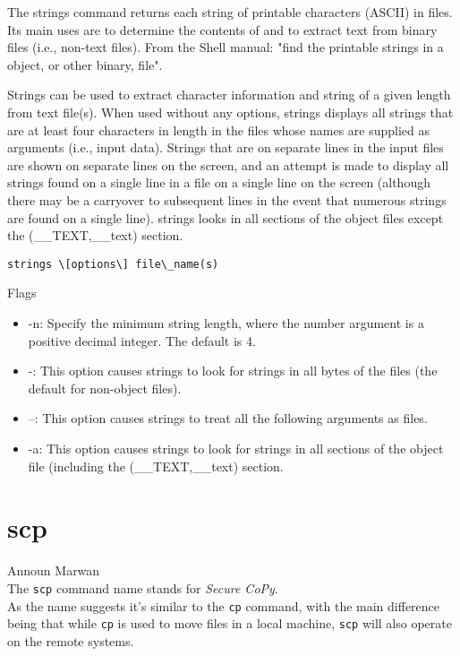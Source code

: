 \documentclass[hidelinks,12pt,a4paper,numbers=enddot]{scrartcl}
\begin{document}
The strings command returns each string of printable characters (ASCII)
in files. Its main uses are to determine the contents of and to extract text
from binary files (i.e., non-text files). From the Shell manual: "find the
printable strings in a object, or other binary, file".




Strings can be used to extract character information and string of a given length
from text file(s). When used without any options, strings displays all strings
that are at least four characters in length in the files whose names are
supplied as arguments (i.e., input data). Strings that are on separate lines
in the input files are shown on separate lines on the screen, and an attempt
is made to display all strings found on a single line in a file on a single
line on the screen (although there may be a carryover to subsequent lines in
the event that numerous strings are found on a single line). strings looks in
all sections of the object files except the (\_\_TEXT,\_\_text) section.


\begin{verbatim}
strings \[options\] file\_name(s)
\end{verbatim}

Flags

\begin{itemize}
    \item -n: Specify the minimum string length, where the number argument is
        a positive decimal integer. The default is 4.
    \item -: This  option  causes strings to look for strings in all bytes of
        the files (the default for non-object files).
    \item --: This option causes strings to treat all the following  arguments
        as files.
    \item -a: This option causes strings to look for strings in  all  sections
        of the object file (including the (\_\_TEXT,\_\_text) section.
\end{itemize}

\section{scp}


\large Announ Marwan \normalsize\\



The \texttt{scp} command name stands for \emph{Secure CoPy}.\\
As the name suggests it's similar to the \texttt{cp} command,
with the main difference being that while \texttt{cp} is used to move files
in a local machine, \texttt{scp} will also operate on the remote systems.\\
\end{document}
